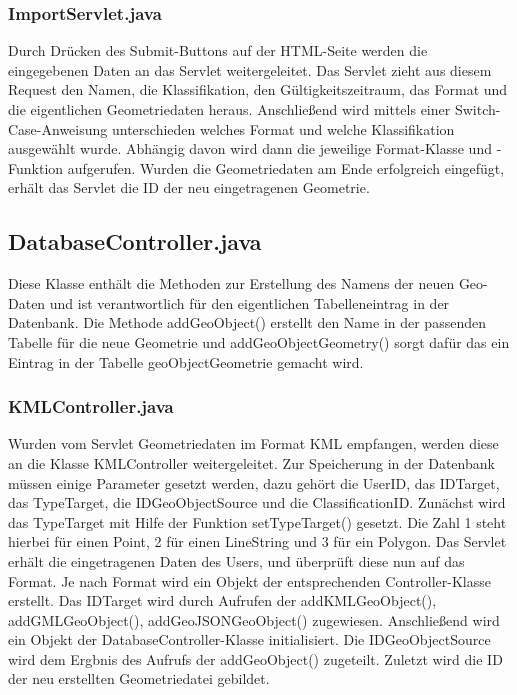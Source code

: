 \documentclass[]{article}
\begin{document}
\subsubsection{ImportServlet.java}
Durch Drücken des Submit-Buttons auf der HTML-Seite werden die eingegebenen Daten an das Servlet weitergeleitet. Das Servlet zieht aus diesem Request den Namen, die Klassifikation, den Gültigkeitszeitraum, das Format und die eigentlichen Geometriedaten heraus. Anschließend wird mittels einer Switch-Case-Anweisung unterschieden welches Format und welche Klassifikation ausgewählt wurde. Abhängig davon wird dann die jeweilige Format-Klasse und -Funktion aufgerufen. Wurden die Geometriedaten am Ende erfolgreich eingefügt, erhält das Servlet die ID der neu eingetragenen Geometrie.

\subsection{DatabaseController.java}
Diese Klasse enthält die Methoden zur Erstellung des Namens der neuen Geo-Daten und ist verantwortlich für den eigentlichen Tabelleneintrag in der Datenbank. Die Methode addGeoObject() erstellt den Name in der passenden Tabelle für die neue Geometrie und addGeoObjectGeometry() sorgt dafür das ein Eintrag in der Tabelle geoObjectGeometrie gemacht wird.

\subsubsection{KMLController.java}
Wurden vom Servlet Geometriedaten im Format KML empfangen, werden diese an die Klasse KMLController weitergeleitet. Zur Speicherung in der Datenbank müssen einige Parameter gesetzt werden, dazu gehört die UserID, das IDTarget, das TypeTarget, die IDGeoObjectSource und die ClassificationID. Zunächst wird das TypeTarget mit Hilfe der Funktion setTypeTarget() gesetzt. Die Zahl 1 steht hierbei für einen Point, 2 für einen LineString und 3 für ein Polygon. Das Servlet erhält die eingetragenen Daten des Users, und überprüft diese nun auf das Format. Je nach Format wird ein Objekt der entsprechenden Controller-Klasse erstellt. Das IDTarget wird durch Aufrufen der addKMLGeoObject(), addGMLGeoObject(), addGeoJSONGeoObject() zugewiesen. Anschließend wird ein Objekt der DatabaseController-Klasse initialisiert. Die IDGeoObjectSource wird dem Ergbnis des Aufrufs der addGeoObject() zugeteilt. Zuletzt wird die ID der neu erstellten Geometriedatei gebildet.
\end{document}
